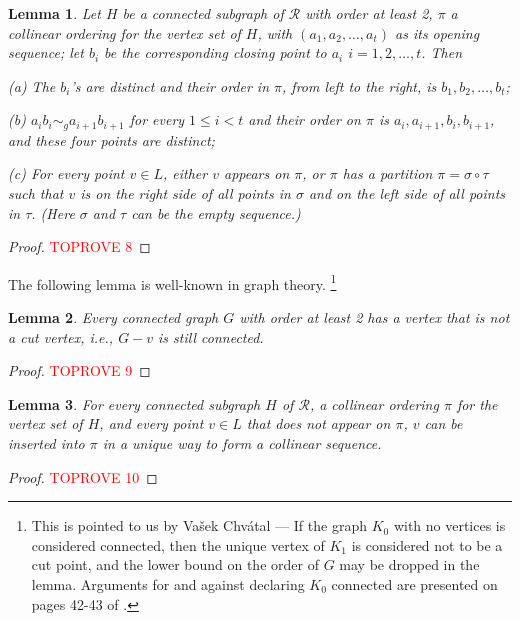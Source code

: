 \documentclass[12pt]{article}
\newtheorem{lem}{Lemma}
\begin{document}
\begin{lem}\label{lem.insertion_order}
Let $H$ be a connected subgraph of $\mathcal{R}$ with order at least 2,
$\pi$ a collinear ordering for the vertex set of $H$,
with $(a_1, a_2, \dots, a_t)$ as its opening sequence;
let $b_i$ be the corresponding closing point to $a_i$ $i = 1, 2, \dots, t$.
Then

(a) The $b_i$'s are distinct and their order in $\pi$, from left to the right, is $b_1, b_2, \dots, b_t$;

(b) $a_i b_i \sim_g a_{i+1}b_{i+1}$ for every $1 \le i < t$ and their order on $\pi$ is $a_i, a_{i+1}, b_i, b_{i+1}$,
and these four points are distinct;

(c) For every point $v \in L$, either $v$ appears on $\pi$, 
or $\pi$ has a partition $\pi = \sigma \circ \tau$ such that $v$
is on the right side of all points in $\sigma$ and on the left side of all
points in $\tau$. (Here $\sigma$ and $\tau$ can be the empty sequence.)
\end{lem}

\begin{proof}\textcolor{red}{TOPROVE 8}\end{proof}

The following lemma is well-known in graph theory.
\footnote{
This is pointed to us by Va\v{s}ek Chv\'atal --- If the graph $K_0$ with no vertices is considered connected, 
then the unique vertex of $K_1$ is considered not to be a cut point,
and the lower bound on the order of $G$ may be dropped in the lemma.
Arguments for and against declaring $K_0$ connected are presented on pages 42-43 of
\cite{HR}.
}

\begin{lem}\label{lem.non_cut_point}
Every connected graph $G$ with order at least 2 has a vertex that is not a cut vertex,
i.e., $G - v$ is still connected.
\end{lem}

\begin{proof}\textcolor{red}{TOPROVE 9}\end{proof}

\begin{lem}\label{lem.insertion}
For every connected subgraph $H$ of $\mathcal{R}$,
a collinear ordering $\pi$ for the vertex set of $H$,
and every point $v \in L$ that does not appear on $\pi$,
$v$ can be inserted into $\pi$ in a unique way to form a collinear sequence.
\end{lem}

\begin{proof}\textcolor{red}{TOPROVE 10}\end{proof}
\end{document}
